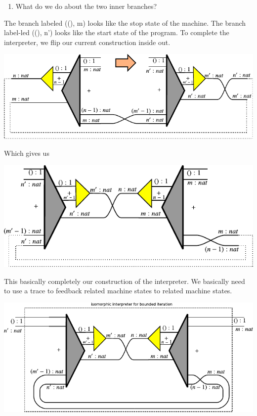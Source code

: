 \documentclass{llncs}
\begin{document}
\begin{enumerate}
\begin{enumerate}
\item What do we do about the two inner branches? 

\end{enumerate}

The branch labeled {{((), m)}} looks like the stop state of the
machine. The branch label-led {{((), n')}} looks like the start state
of the program. To complete the interpreter, we flip our current
construction inside out.

\begin{center}
  \includegraphics{diagrams/nat-nat6.pdf}
\end{center}

Which gives us

\begin{center}
  \includegraphics{diagrams/nat-nat7.pdf}
\end{center}

This basically completely our construction of the interpreter. We
basically need to use a {{trace}} to feedback related machine states
to related machine states.

\begin{center}
  \includegraphics{diagrams/nat-nat8.pdf}
\end{center}

\end{enumerate}
\end{document}
